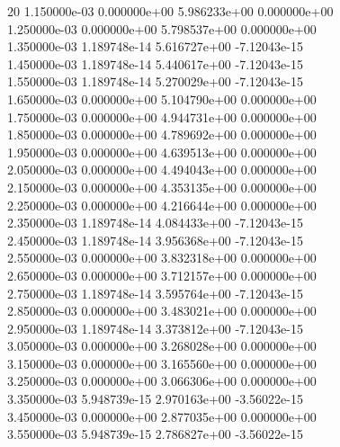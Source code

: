 20	1.150000e-03	0.000000e+00	5.986233e+00	0.000000e+00	\\ 	1.250000e-03	0.000000e+00	5.798537e+00	0.000000e+00	\\ 	1.350000e-03	1.189748e-14	5.616727e+00	-7.12043e-15	\\ 	1.450000e-03	1.189748e-14	5.440617e+00	-7.12043e-15	\\ 	1.550000e-03	1.189748e-14	5.270029e+00	-7.12043e-15	\\ 	1.650000e-03	0.000000e+00	5.104790e+00	0.000000e+00	\\ 	1.750000e-03	0.000000e+00	4.944731e+00	0.000000e+00	\\ 	1.850000e-03	0.000000e+00	4.789692e+00	0.000000e+00	\\ 	1.950000e-03	0.000000e+00	4.639513e+00	0.000000e+00	\\ 	2.050000e-03	0.000000e+00	4.494043e+00	0.000000e+00	\\ 	2.150000e-03	0.000000e+00	4.353135e+00	0.000000e+00	\\ 	2.250000e-03	0.000000e+00	4.216644e+00	0.000000e+00	\\ 	2.350000e-03	1.189748e-14	4.084433e+00	-7.12043e-15	\\ 	2.450000e-03	1.189748e-14	3.956368e+00	-7.12043e-15	\\ 	2.550000e-03	0.000000e+00	3.832318e+00	0.000000e+00	\\ 	2.650000e-03	0.000000e+00	3.712157e+00	0.000000e+00	\\ 	2.750000e-03	1.189748e-14	3.595764e+00	-7.12043e-15	\\ 	2.850000e-03	0.000000e+00	3.483021e+00	0.000000e+00	\\ 	2.950000e-03	1.189748e-14	3.373812e+00	-7.12043e-15	\\ 	3.050000e-03	0.000000e+00	3.268028e+00	0.000000e+00	\\ 	3.150000e-03	0.000000e+00	3.165560e+00	0.000000e+00	\\ 	3.250000e-03	0.000000e+00	3.066306e+00	0.000000e+00	\\ 	3.350000e-03	5.948739e-15	2.970163e+00	-3.56022e-15	\\ 	3.450000e-03	0.000000e+00	2.877035e+00	0.000000e+00	\\ 	3.550000e-03	5.948739e-15	2.786827e+00	-3.56022e-15	\\ \hline
